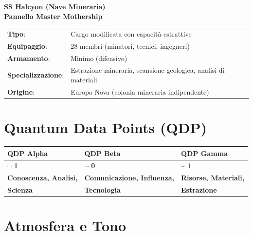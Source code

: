 \documentclass[11pt,a4paper]{article}
\begin{document}
\begin{center}
\Huge\textbf{\textcolor{miningorange}{SS Halcyon (Nave Mineraria)}}\\[0.5cm]
\Large\textbf{Pannello Master Mothership}
\end{center}

\begin{tcolorbox}[colback=mininglightorange!20, colframe=miningorange, title=\textbf{Informazioni sulla Nave}]
\begin{tabular}{ll}
\textbf{Tipo}: & Cargo modificata con capacità estrattive \\
\textbf{Equipaggio}: & 28 membri (minatori, tecnici, ingegneri) \\
\textbf{Armamento}: & Minimo (difensivo) \\
\textbf{Specializzazione}: & Estrazione mineraria, scansione geologica, analisi di materiali \\
\textbf{Origine}: & Europa Nova (colonia mineraria indipendente) \\
\end{tabular}
\end{tcolorbox}

\section{Quantum Data Points (QDP)}

\begin{tcolorbox}[colback=mininglightorange!10, colframe=miningorange]
\begin{tabularx}{\textwidth}{|X|X|X|}
\hline
\rowcolor{miningorange!20} \textbf{QDP Alpha} & \textbf{QDP Beta} & \textbf{QDP Gamma} \\
\hline
\large $\square\square$ \textbf{1} & \large $\square\square$ \textbf{0} & \large $\square\square$ \textbf{1} \\
\hline
\textbf{Conoscenza, Analisi,} & \textbf{Comunicazione, Influenza,} & \textbf{Risorse, Materiali,} \\
\textbf{Scienza} & \textbf{Tecnologia} & \textbf{Estrazione} \\
\hline
\end{tabularx}
\end{tcolorbox}

\section{Atmosfera e Tono}
\end{document}
